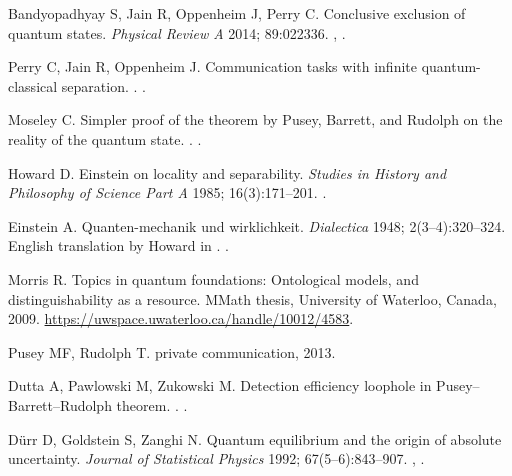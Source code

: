 \documentclass[DIV=calc,fontsize=12pt]{scrartcl} %
\theoremstyle{definition}
\theoremstyle{plain}
\begin{document}
\begin{thebibliography}{10}
Bandyopadhyay S, Jain R, Oppenheim J, Perry C.
\newblock Conclusive exclusion of quantum states.
\newblock \emph{Physical Review A} 2014; 89:022336.
\newblock \href {http://arxiv.org/abs/1306.4683} {},
\href {http://dx.doi.org/10.1103/PhysRevA.89.022336}
{}.

Perry C, Jain R, Oppenheim J.
\newblock Communication tasks with infinite quantum-classical separation.
.
\newblock \href {http://arxiv.org/abs/1407.8217} {}.

Moseley C.
\newblock Simpler proof of the theorem by Pusey, Barrett, and Rudolph on
the reality of the quantum state.
.
\newblock \href {http://arxiv.org/abs/1401.0026} {}.

Howard D.
\newblock Einstein on locality and separability.
\newblock \emph{Studies in History and Philosophy of Science Part A} 1985; 16(3):171--201.
\newblock \href {http://dx.doi.org/10.1016/0039-3681(85)90001-9}
{}.

Einstein A.
\newblock Quanten-mechanik und wirklichkeit.
\newblock \emph{Dialectica} 1948; 2(3--4):320--324.
\newblock English translation by Howard in \cite{Howard1985}.
\newblock \href {http://dx.doi.org/10.1111/j.1746-8361.1948.tb00704.x}
{}.

Morris R.
\newblock Topics in quantum foundations: Ontological models, and
distinguishability as a resource.
\newblock MMath thesis, University of Waterloo, Canada, 2009.
\newblock \url{https://uwspace.uwaterloo.ca/handle/10012/4583}.

Pusey MF, Rudolph T.
\newblock private communication, 2013.

Dutta A, Pawlowski M, Zukowski M.
\newblock Detection efficiency loophole in Pusey--Barrett--Rudolph theorem.
.
\newblock \href {http://arxiv.org/abs/1407.5577} {}.

D{\"u}rr D, Goldstein S, Zanghi N.
\newblock Quantum equilibrium and the origin of absolute uncertainty.
\newblock \emph{Journal of Statistical Physics} 1992; 67(5--6):843--907.
\newblock \href {http://arxiv.org/abs/quant-ph/0308039}
{}, \href {http://dx.doi.org/10.1007/BF01049004}
{}.


\end{thebibliography}
\end{document}
